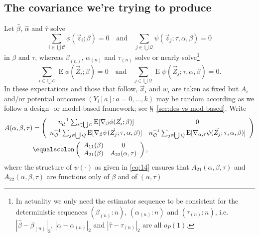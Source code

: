 \documentclass{article}
\newcommand{\eqdef}{\ensuremath{\equalscolon}}
\newcommand{\EE}{\operatorname{E}}
\begin{document}
\subsection{The covariance we're trying to
  produce}\label{sec:covar-were-trying}

Let $\hat\beta$, $\hat{\alpha}$ and $\hat\tau$ solve
\[\sum_{i\in \bigcup \mathcal{C}}\phi(\vec{z}_{i}; \beta )
  =0\quad\text{and}\quad
\sum_{j\in \bigcup \mathcal{Q}}\psi(\vec{z}_{j}; \tau,
\alpha, \beta )  =0
  \]
  in $\beta$ and $\tau$, whereas $\beta_{(n)}$, $\alpha_{(n)}$ and $\tau_{(n)}$ solve or nearly solve\footnote{%
In actuality we only need the estimator sequence to be consistent for the deterministic sequences $(\beta_{(n)}:n)$, $(\alpha_{(n)}:n)$ and $(\tau_{(n)}:n)$, i.e. $|\hat\beta - \beta_{(n)}|_{2}$, $|\hat\alpha - \alpha_{(n)}|_{2}$ and $|\hat\tau - \tau_{(n)}|_{2}$ are all $o_{P}(1)$.%
}
\[\sum_{i\in \bigcup \mathcal{C}}\EE\phi(\vec{Z}_{i}; \beta )
  =0\quad\text{and}\quad
\sum_{j\in \bigcup \mathcal{Q}}\EE\psi(\vec{Z}_{j}; \tau,
\alpha, \beta )  =0.
  \]
In these expectations and those that follow, $\vec{x}_{i}$ and $w_{i}$
are taken as fixed but $A_{i}$ and/or potential outcomes $(Y_{i}[a]:
a=0, \ldots, k)$ may be random according as we follow a design- or
model-based framework; see \S~\ref{sec:des-vs-mod-based}.
  Write
  \begin{align}
\nonumber
    A(\alpha, \beta, \tau) &= \left(
      \begin{array}{cc}
        n_{\mathcal{C}}^{-1}\sum_{i\in \bigcup
        \mathcal{C}}\EE [\nabla_{\beta}\phi(\vec{Z}_{i};
        \beta )]&0\\
        n_{\mathcal{Q}}^{-1}\sum_{j\in \bigcup
        \mathcal{Q}}\EE[ \nabla_{\beta}\psi(\vec{Z}_{j};
        \tau, \alpha, \beta )]  & n_{\mathcal{Q}}^{-1}\sum_{j\in \bigcup
        \mathcal{Q}}\EE[ \nabla_{\alpha, \tau}\psi(\vec{Z}_{j};
        \tau, \alpha, \beta )]
      \end{array}
                                  \right)\\
    \label{eq:13}    
    &\eqdef \left(
      \begin{array}{cc}
        A_{11}(\beta)& 0\\
        A_{21}(\beta) & A_{22}(\alpha, \tau)
      \end{array}
\right),
  \end{align}
where the structure of $\psi(\cdot)$ as given in \eqref{eq:14} ensures
that $A_{21}(\alpha, \beta, \tau)$ and $A_{22}(\alpha, \beta, \tau)$
are functions only of $\beta$ and of $(\alpha, \tau)$
\end{document}
